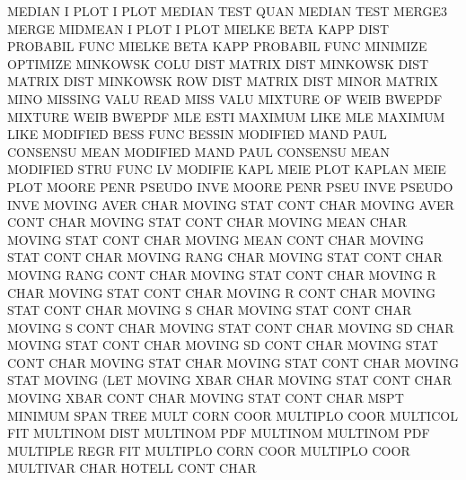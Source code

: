 MEDIAN   I    PLOT                      I        PLOT
MEDIAN   TEST QUAN                      MEDIAN   TEST
MERGE3                                  MERGE
MIDMEAN  I    PLOT                      I        PLOT
MIELKE   BETA KAPP DIST                 PROBABIL FUNC
MIELKE   BETA KAPP                      PROBABIL FUNC
MINIMIZE                                OPTIMIZE
MINKOWSK COLU DIST                      MATRIX   DIST
MINKOWSK DIST                           MATRIX   DIST
MINKOWSK ROW  DIST                      MATRIX   DIST
MINOR                                   MATRIX   MINO
MISSING  VALU                           READ     MISS VALU 
MIXTURE  OF   WEIB                      BWEPDF
MIXTURE  WEIB                           BWEPDF
MLE      ESTI                           MAXIMUM  LIKE
MLE                                     MAXIMUM  LIKE
MODIFIED BESS FUNC                      BESSIN
MODIFIED MAND PAUL                      CONSENSU MEAN
MODIFIED MAND PAUL                      CONSENSU MEAN
MODIFIED STRU FUNC                      LV
MODIFIE  KAPL MEIE PLOT                 KAPLAN   MEIE PLOT
MOORE    PENR                           PSEUDO   INVE
MOORE    PENR PSEU INVE                 PSEUDO   INVE
MOVING   AVER CHAR                      MOVING   STAT CONT CHAR
MOVING   AVER CONT CHAR                 MOVING   STAT CONT CHAR
MOVING   MEAN CHAR                      MOVING   STAT CONT CHAR
MOVING   MEAN CONT CHAR                 MOVING   STAT CONT CHAR
MOVING   RANG CHAR                      MOVING   STAT CONT CHAR
MOVING   RANG CONT CHAR                 MOVING   STAT CONT CHAR
MOVING   R    CHAR                      MOVING   STAT CONT CHAR
MOVING   R    CONT CHAR                 MOVING   STAT CONT CHAR
MOVING   S    CHAR                      MOVING   STAT CONT CHAR
MOVING   S    CONT CHAR                 MOVING   STAT CONT CHAR
MOVING   SD   CHAR                      MOVING   STAT CONT CHAR
MOVING   SD   CONT CHAR                 MOVING   STAT CONT CHAR
MOVING   STAT CHAR                      MOVING   STAT CONT CHAR
MOVING   STAT                           MOVING   (LET
MOVING   XBAR CHAR                      MOVING   STAT CONT CHAR
MOVING   XBAR CONT CHAR                 MOVING   STAT CONT CHAR
MSPT                                    MINIMUM  SPAN TREE
MULT     CORN COOR                      MULTIPLO COOR
MULTICOL                                FIT
MULTINOM DIST                           MULTINOM PDF
MULTINOM                                MULTINOM PDF
MULTIPLE REGR                           FIT
MULTIPLO CORN COOR                      MULTIPLO COOR
MULTIVAR CHAR                           HOTELL   CONT CHAR

